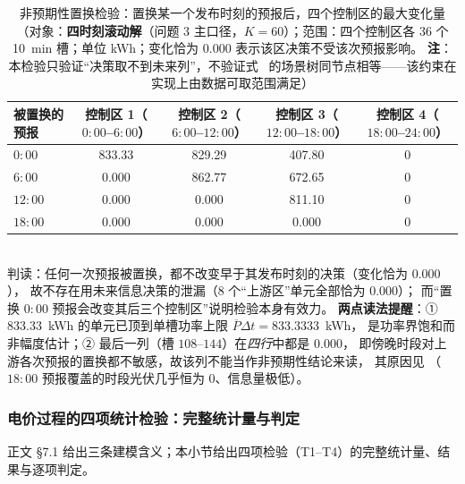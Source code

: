 \begin{table}[htbp]
  \centering
  \caption{非预期性置换检验：置换某一个发布时刻的预报后，四个控制区的最大变化量
           （对象：\textbf{四时刻滚动解}（问题 3 主口径，$K=60$）；范围：四个控制区各 36 个
           10~min 槽；单位 kWh；变化恰为 $0.000$ 表示该区决策不受该次预报影响。
           \textbf{注}：本检验只验证“决策取不到未来列”，不验证式~
           的场景树同节点相等——该约束在实现上由数据可取范围满足）}
  \label{tab:na-app}
  \footnotesize
  \setlength{\tabcolsep}{5pt}
  \begin{tabular}{lcccc}
    \toprule
    被置换的预报 & 控制区 1（$0{:}00$--$6{:}00$） & 控制区 2（$6{:}00$--$12{:}00$）
                 & 控制区 3（$12{:}00$--$18{:}00$） & 控制区 4（$18{:}00$--$24{:}00$） \\
    \midrule
    \(0{:}00\) & 833.33 & 829.29 & 407.80 & 0 \\
    \(6{:}00\) & 0.000  & 862.77 & 672.65 & 0 \\
    \(12{:}00\)& 0.000  & 0.000  & 811.10 & 0 \\
    \(18{:}00\)& 0.000  & 0.000  & 0.000  & 0 \\
    \bottomrule
  \end{tabular}
  \\[1ex]
  {\footnotesize 判读：任何一次预报被置换，都不改变早于其发布时刻的决策（变化恰为 $0.000$），
   故不存在用未来信息决策的泄漏（8 个“上游区”单元全部恰为 $0.000$）；
而“置换 $0{:}00$ 预报会改变其后三个控制区”说明检验本身有效力。
   \textbf{两点读法提醒}：① $833.33$~kWh 的单元已顶到单槽功率上限 $\overline P\Delta t=833.3333$~kWh，
   是功率界饱和而非幅度估计；② 最后一列（槽 $108$--$144$）在\emph{四行}中都是 $0.000$，
   即傍晚时段对上游各次预报的置换都不敏感，故该列不能当作非预期性结论来读，
   其原因见 （$18{:}00$ 预报覆盖的时段光伏几乎恒为 0、信息量极低）。}
\end{table}


\subsubsection{电价过程的四项统计检验：完整统计量与判定}\label{sec:price-test-app}

正文 \S7.1 给出三条建模含义；本小节给出四项检验（T1--T4）的完整统计量、结果与逐项判定。

